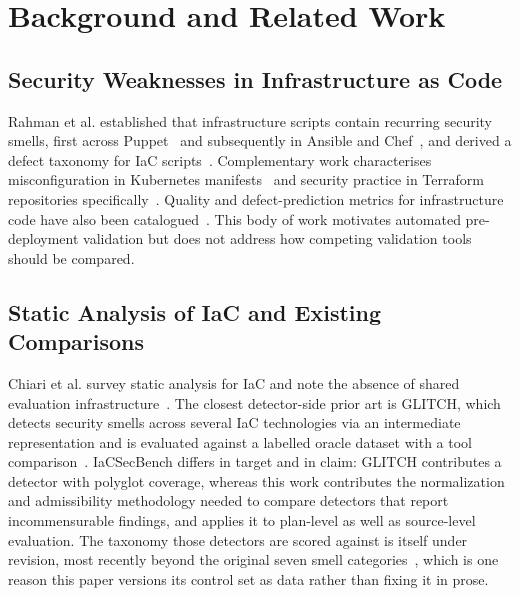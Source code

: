 \documentclass[journal]{IEEEtran}
\begin{document}
\section{Background and Related Work}

\subsection{Security Weaknesses in Infrastructure as Code}
Rahman et al. established that infrastructure scripts contain recurring security
smells, first across Puppet~\cite{rahman2019sins} and subsequently in Ansible and
Chef~\cite{rahman2021replication}, and derived a defect taxonomy for IaC
scripts~\cite{rahman2020gang}. Complementary work characterises misconfiguration
in Kubernetes manifests~\cite{rahman2023k8s, shamim2020xi} and security practice
in Terraform repositories specifically~\cite{verdet2023exploring, verdet2025adoption}. Quality and
defect-prediction metrics for infrastructure code have also been
catalogued~\cite{dallapalma2020catalog, dallapalma2022within}. This body of work
motivates automated pre-deployment validation but does not address how competing
validation tools should be compared.

\subsection{Static Analysis of IaC and Existing Comparisons}
Chiari et al. survey static analysis for IaC and note the absence of shared
evaluation infrastructure~\cite{chiari2022static}. The closest detector-side prior
art is GLITCH, which detects security smells across several IaC technologies via
an intermediate representation and is evaluated against a labelled oracle dataset
with a tool comparison~\cite{saavedra2022glitch, saavedra2023polyglot}.
IaCSecBench differs in target and in claim: GLITCH contributes a detector with
polyglot coverage, whereas this work contributes the normalization and
admissibility methodology needed to compare detectors that report incommensurable
findings, and applies it to plan-level as well as source-level evaluation. The
taxonomy those detectors are scored against is itself under revision, most
recently beyond the original seven smell categories~\cite{war2025taxonomy}, which
is one reason this paper versions its control set as data rather than fixing it in
prose.
\end{document}
